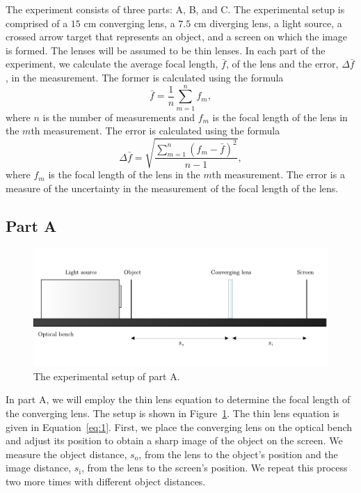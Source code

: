 \documentclass[10pt]{article}
\begin{document}
The experiment consists of three parts: A, B, and C. The experimental setup is comprised of a $15$ cm converging lens, a $7.5$ cm diverging lens, a light source, a crossed arrow target that represents an object, and a screen on which the image is formed. The lenses will be assumed to be thin lenses. In each part of the experiment, we calculate the average focal length, $\bar{f}$, of the lens and the error, $\Delta \bar{f}$, in the measurement. The former is calculated using the formula
\begin{equation}
  \bar{f} = \dfrac{1}{n} \sum_{m=1}^{n} f_{m},
\end{equation}
where $n$ is the number of measurements and $f_{m}$ is the focal length of the lens in the $m$th measurement. The error is calculated using the formula
\begin{equation}
  \Delta \bar{f} = \sqrt{\dfrac{\sum_{m=1}^{n} (f_m - \bar{f})^2}{n-1}},
\end{equation}
where $f_m$ is the focal length of the lens in the $m$th measurement. The error is a measure of the uncertainty in the measurement of the focal length of the lens.

\subsection*{Part A}

\begin{figure}[hbt!]
  \centering
  \includegraphics[scale=0.5]{figures/f3.pdf}
  \caption{The experimental setup of part A.}
  \label{fig:3}
\end{figure}

In part A, we will employ the thin lens equation to determine the focal length of the converging lens. The setup is shown in Figure~\ref{fig:3}. The thin lens equation is given in Equation~\ref{eq:1}. First, we place the converging lens on the optical bench and adjust its position to obtain a sharp image of the object on the screen. We measure the object distance, $s_{\text{o}}$, from the lens to the object's position and the image distance, $s_{\text{i}}$, from the lens to the screen's position. We repeat this process two more times with different object distances.
\end{document}
